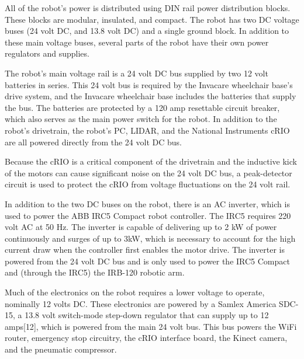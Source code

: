 \documentclass[]{cwru} %
\begin{document}
All of the robot's power is distributed using DIN rail power
distribution blocks. These blocks are modular, insulated, and compact.
The robot has two DC voltage buses (24 volt DC, and 13.8 volt DC) and a
single ground block. In addition to these main voltage buses, several
parts of the robot have their own power regulators and supplies.

The robot's main voltage rail is a 24 volt DC bus supplied by two 12
volt batteries in series. This 24 volt bus is required by the Invacare
wheelchair base's drive system, and the Invacare wheelchair base
includes the batteries that supply the bus. The batteries are protected
by a 120 amp resettable circuit breaker, which also serves as the main
power switch for the robot. In addition to the robot's drivetrain, the
robot's PC, LIDAR, and the National Instruments cRIO are all powered
directly from the 24 volt DC bus.

Because the cRIO is a critical component of the drivetrain and the
inductive kick of the motors can cause significant noise on the 24 volt
DC bus, a peak-detector circuit is used to protect the cRIO from voltage
fluctuations on the 24 volt rail.

In addition to the two DC buses on the robot, there is an AC inverter,
which is used to power the ABB IRC5 Compact robot controller. The IRC5
requires 220 volt AC at 50 Hz. The inverter is capable of delivering up
to 2 kW of power continuously and surges of up to 3kW, which is
necessary to account for the high current draw when the controller first
enables the motor drive. The inverter is powered from the 24 volt DC bus
and is only used to power the IRC5 Compact and (through the IRC5) the
IRB-120 robotic arm.

Much of the electronics on the robot requires a lower voltage to
operate, nominally 12 volts DC. These electronics are powered by a
Samlex America SDC-15, a 13.8 volt switch-mode step-down regulator that
can supply up to 12 amps{[}12{]}, which is powered from the main 24 volt
bus. This bus powers the WiFi router, emergency stop circuitry, the cRIO
interface board, the Kinect camera, and the pneumatic compressor.
\end{document}
